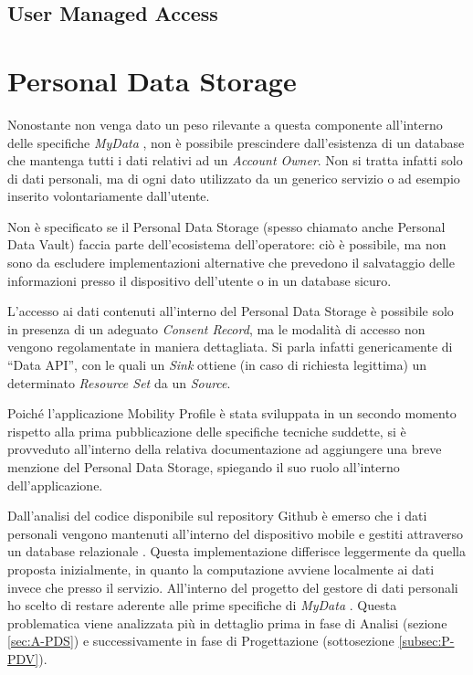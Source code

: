 \subsection{User Managed Access}
\cite{uma}

\section{Personal Data Storage}
Nonostante non venga dato un peso rilevante a questa componente all’interno delle specifiche \textit{MyData} \cite{githubmydatastack}, non \`e possibile prescindere dall’esistenza di un database che mantenga tutti i dati relativi ad un \textit{Account Owner}. Non si tratta infatti solo di dati personali, ma di ogni dato utilizzato da un generico servizio o ad esempio inserito volontariamente dall’utente.

Non \`e specificato se il Personal Data Storage (spesso chiamato anche Personal Data Vault) faccia parte dell’ecosistema dell’operatore: ci\`o \`e possibile, ma non sono da escludere implementazioni alternative che prevedono il salvataggio delle informazioni presso il dispositivo dell’utente o in un database sicuro.

L’accesso ai dati contenuti all’interno del Personal Data Storage \`e possibile solo in presenza di un adeguato \textit{Consent Record}, ma le modalit\`a di accesso non vengono regolamentate in maniera dettagliata. Si parla infatti genericamente di “Data API”, con le quali un \textit{Sink} ottiene (in caso di richiesta legittima) un determinato \textit{Resource Set} da un \textit{Source}.

Poiché l’applicazione Mobility Profile \`e stata sviluppata in un secondo momento rispetto alla prima pubblicazione delle specifiche tecniche suddette, si \`e provveduto all’interno della relativa documentazione \cite{githubmobilityprofilespecification} ad aggiungere una breve menzione del Personal Data Storage, spiegando il suo ruolo all’interno dell’applicazione.

Dall’analisi del codice disponibile sul repository Github \cite{githubmobilityprofile} \`e emerso che i dati personali vengono mantenuti all’interno del dispositivo mobile e gestiti attraverso un database relazionale \cite{ormSugar}. Questa implementazione differisce leggermente da quella proposta inizialmente, in quanto la computazione avviene localmente ai dati invece che presso il servizio. All’interno del progetto del gestore di dati personali ho scelto di restare aderente alle prime specifiche di \textit{MyData} \cite{githubmydatastack}. Questa problematica viene analizzata pi\`u in dettaglio prima in fase di Analisi (sezione \ref{sec:A-PDS}) e successivamente in fase di Progettazione (sottosezione \ref{subsec:P-PDV}).